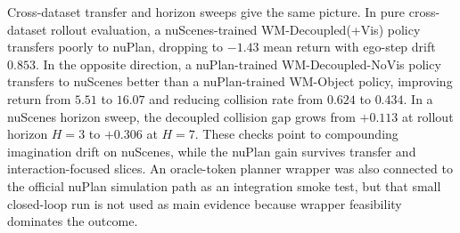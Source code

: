 \documentclass[10pt,journal,compsoc]{IEEEtran}
\begin{document}
\begin{table}[!t]
\caption{Cross-dataset transfer and horizon sensitivity. Transfer rows report mean $\pm$ sample standard deviation over three seeds. Horizon rows come from the synchronized nuScenes sweep.}
\label{tab:support_diagnostics}
\centering
{}
\end{table}


Cross-dataset transfer and horizon sweeps give the same picture. In pure cross-dataset rollout evaluation, a nuScenes-trained WM-Decoupled(+Vis) policy transfers poorly to nuPlan, dropping to $-1.43$ mean return with ego-step drift $0.853$. In the opposite direction, a nuPlan-trained WM-Decoupled-NoVis policy transfers to nuScenes better than a nuPlan-trained WM-Object policy, improving return from $5.51$ to $16.07$ and reducing collision rate from $0.624$ to $0.434$. In a nuScenes horizon sweep, the decoupled collision gap grows from $+0.113$ at rollout horizon $H=3$ to $+0.306$ at $H=7$. These checks point to compounding imagination drift on nuScenes, while the nuPlan gain survives transfer and interaction-focused slices. An oracle-token planner wrapper was also connected to the official nuPlan simulation path as an integration smoke test, but that small closed-loop run is not used as main evidence because wrapper feasibility dominates the outcome.
\end{document}
